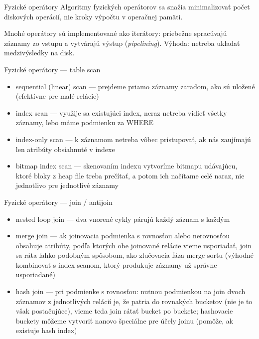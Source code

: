 \documentclass[12pt]{beamer}
\begin{document}
\begin{frame}[fragile]{Fyzické operátory}
Algoritmy fyzických operátorov sa snažia minimalizovať počet diskových operácií,
nie kroky výpočtu v operačnej pamäti.
\bigskip

Mnohé operátory sú implementované ako iterátory:
priebežne spracúvajú záznamy zo vstupu a vytvárajú výstup (\emph{pipelining}).
Výhoda: netreba ukladať medzivýsledky na disk.
\end{frame}

\begin{frame}[fragile]{Fyzické operátory --- table scan}
\begin{itemize}
\item \alert{sequential (linear) scan} --- prejdeme priamo záznamy zaradom, ako sú uložené (efektívne pre malé relácie)
\item \alert{index scan} --- využije sa existujúci index, neraz netreba vidieť všetky záznamy, lebo máme podmienku za WHERE
\item \alert{index-only scan} --- k záznamom netreba vôbec pristupovať, ak nás zaujímajú len atribúty obsiahnuté v indexe
\item \alert{bitmap index scan} --- skenovaním indexu vytvoríme bitmapu udávajúcu, ktoré bloky z heap file treba prečítať, a potom ich načítame celé naraz, nie jednotlivo pre jednotlivé záznamy
\end{itemize}
\end{frame}

\begin{frame}[fragile]{Fyzické operátory --- join / antijoin}
\begin{itemize}
\item \alert{nested loop join} --- dva vnorené cykly párujú každý záznam s každým
\item \alert{merge join} --- ak joinovacia podmienka s rovnosťou alebo nerovnosťou obsahuje atribúty,
    podľa ktorých obe joinované relácie vieme usporiadať, join sa ráta ľahko podobným spôsobom,
    ako zlučovacia fáza merge-sortu
    (výhodné kombinovať s index scanom, ktorý produkuje záznamy už správne usporiadané)
\item \alert{hash join} --- pri podmienke s rovnosťou: nutnou podmienkou na join
    dvoch záznamov z jednotlivých relácií je, že patria do rovnakých bucketov
    (nie je to však postačujúce), vieme teda join rátať bucket po buckete;
    hashovacie buckety môžeme vytvoriť nanovo špeciálne pre účely joinu
    (pomôže, ak existuje hash index)
\end{itemize}
\end{frame}
\end{document}
